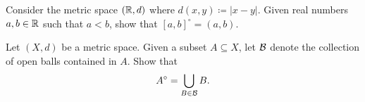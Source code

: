 \documentclass[../main.tex]{subfiles}
\begin{document}
\begin{homework}
    Consider the metric space $(\mathbb R,d)$ where $d(x,y)\coloneqq|x-y|$. Given real numbers $a,b\in\mathbb R$ such that $a<b$, show that $[a,b]^\circ=(a,b)$.
\end{homework}
\begin{homework}
    Let $(X,d)$ be a metric space. Given a subset $A\subseteq X$, let $\mathcal{B}$ denote the collection of open balls contained in $A$. Show that
    \[A^\circ=\bigcup_{B\in\mathcal{B}}B.\]
\end{homework}
\end{document}
